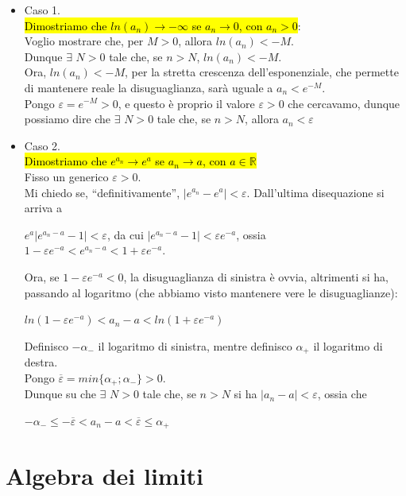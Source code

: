 \documentclass{article}
\theoremstyle{definition}
\newcommand{\virgolette}[1]{``#1''}
\begin{document}
\begin{itemize}
    \item Caso 1.
    \\
    \hl{Dimostriamo che $ln(a_n) \to -\infty$ se $a_n \to 0$, con $a_n > 0$}:
    \\
    Voglio mostrare che, per $M>0$, allora $ln(a_n) < -M$.
    \\
    Dunque $\exists$ $N>0$ tale che, se $n>N$, $ln(a_n)<-M$.
    \\
    Ora, $ln(a_n)<-M$, per la stretta crescenza dell'esponenziale, che permette di mantenere reale la disuguaglianza, sarà uguale a $a_n<e^{-M}$.
    \\
    Pongo $\varepsilon = e^{-M}>0 $, e questo è proprio il valore $\varepsilon>0$ che cercavamo, dunque possiamo dire che $\exists$ $N>0$ tale che, se $n>N$, allora $a_n<\varepsilon$
\item Caso 2.
\\
\hl{Dimostriamo che $e^{a_n} \to e^a$ se $a_n \to a$, con $a \in \mathbb{R}$}
\\
Fisso un generico $\varepsilon>0$.
\\
Mi chiedo se, \virgolette{definitivamente}, $|e^{a_n}-e^a|<\varepsilon$.
Dall'ultima disequazione si arriva a 
\begin{center}
    $e^a|e^{a_n-a}-1|<\varepsilon$, da cui $|e^{a_n-a}-1|<\varepsilon e^{-a}$, ossia
    \\
    $ 1- \varepsilon e^{-a} < e^{a_n-a} <1+ \varepsilon e^{-a}$.

    
\end{center}
Ora, se $1- \varepsilon e^{-a}<0$, la disuguaglianza di sinistra è ovvia, altrimenti si ha, passando al logaritmo (che abbiamo visto mantenere vere le disuguaglianze):
\begin{center}
    $ln(1- \varepsilon e^{-a})<a_n-a<ln(1+ \varepsilon e^{-a})$
\end{center}
Definisco $-\alpha_-$ il logaritmo di sinistra, mentre definisco $\alpha_+$ il logaritmo di destra.
\\
Pongo $\overline{\varepsilon}=min\{\alpha_+;\alpha_-\}>0$.
\\
Dunque su che $\exists$ $N>0$ tale che, se $n>N$ si ha $|a_n-a|<\varepsilon$, ossia che
\begin{center}
    $-\alpha_- \leqslant -\overline{\varepsilon} < a_n-a < \overline{\varepsilon} \leqslant \alpha_+$
\end{center}
\end{itemize}
\newpage
\section{Algebra dei limiti}
\end{document}
